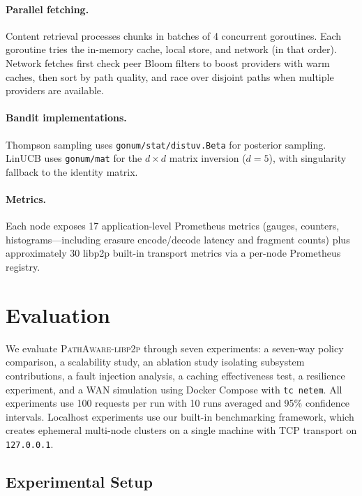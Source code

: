 \documentclass[sigconf,nonacm]{acmart}
\begin{document}
\paragraph{Parallel fetching.} Content retrieval processes chunks in batches of 4 concurrent goroutines. Each goroutine tries the in-memory cache, local store, and network (in that order). Network fetches first check peer Bloom filters to boost providers with warm caches, then sort by path quality, and race over disjoint paths when multiple providers are available.

\paragraph{Bandit implementations.} Thompson sampling uses \texttt{gonum/stat/distuv.Beta} for posterior sampling. LinUCB uses \texttt{gonum/mat} for the $d \times d$ matrix inversion ($d{=}5$), with singularity fallback to the identity matrix.

\paragraph{Metrics.} Each node exposes 17 application-level Prometheus metrics (gauges, counters, histograms---including erasure encode/decode latency and fragment counts) plus approximately 30 libp2p built-in transport metrics via a per-node Prometheus registry.

\section{Evaluation}
\label{sec:evaluation}

We evaluate \textsc{PathAware-libp2p} through seven experiments: a seven-way policy comparison, a scalability study, an ablation study isolating subsystem contributions, a fault injection analysis, a caching effectiveness test, a resilience experiment, and a WAN simulation using Docker Compose with \texttt{tc netem}. All experiments use 100 requests per run with 10 runs averaged and 95\% confidence intervals. Localhost experiments use our built-in benchmarking framework, which creates ephemeral multi-node clusters on a single machine with TCP transport on \texttt{127.0.0.1}.

\subsection{Experimental Setup}
\end{document}
